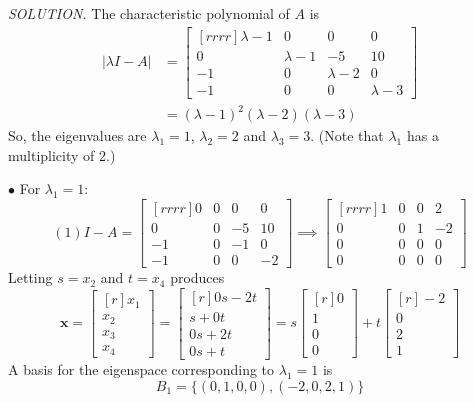 \documentclass{article}
\begin{document}
    \textit{\textcolor{blue5}{SOLUTION.}} The characteristic polynomial of $A$ is 
    \begin{equation*}
        \begin{split}
            | \lambda  I - A| &= \begin{bmatrix}[rrrr]
        \lambda  - 1 & 0 & 0 & 0 \\
        0 & \lambda  - 1 & -5 & 10 \\
        -1 & 0 & \lambda  -2 & 0\\
        -1 & 0 & 0 & \lambda  -3
    \end{bmatrix} \\
    &= ( \lambda  - 1 )^2( \lambda  - 2 )( \lambda -3 )
        \end{split}
    \end{equation*}
    So, the eigenvalues are $\lambda_1 = 1$, $\lambda_2 = 2$ and $ \lambda _3 = 3$. (Note that $ \lambda _1$ has a multiplicity of 2.)
    
    $\bullet$ For $\lambda_1 = 1$:
    \[(1)I - A = \begin{bmatrix}[rrrr]
        0 & 0 & 0 & 0 \\
        0 & 0 & -5 & 10\\
        -1 & 0 & -1 & 0 \\
        -1 & 0 & 0 & -2
    \end{bmatrix} \implies \begin{bmatrix}[rrrr]
        1 & 0 & 0 & 2 \\
        0 & 0 & 1 & -2 \\
        0 & 0 & 0 & 0 \\
        0 & 0 & 0 & 0 
    \end{bmatrix} \]
    Letting $s = x_2$ and $t = x_4$ produces
    \[ \textbf{x} = \begin{bmatrix}[r]
        x_1 \\ x_2 \\ x_3 \\ x_4
    \end{bmatrix} = \begin{bmatrix}[r]
        0s - 2t \\ s + 0t \\ 0s + 2t \\ 0s + t
    \end{bmatrix} = s \begin{bmatrix}[r]
        0 \\ 1 \\ 0 \\ 0 
    \end{bmatrix} + t \begin{bmatrix}[r]
    -2 \\ 0 \\ 2 \\ 1
    \end{bmatrix} \]
    A basis for the eigenspace corresponding to $ \lambda _1 = 1$ is
    \[B_1 = \{(0,1,0,0), (-2,0,2,1) \} \]
    
\end{document}

